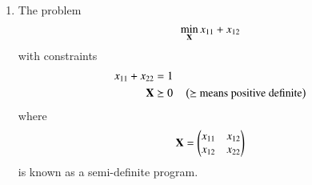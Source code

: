 \begin{enumerate}[label=\thesection.\arabic*,ref=\thesection.\theenumi]
%
%
%


\item
%
\label{prob:cvxopt}

The problem
\begin{equation}
\min_{\mathbf{X}} x_{11} + x_{12}
\end{equation}
%	
with constraints
\begin{align}
x_{11} + x_{22} &= 1 \\	
\mathbf{X}
& \succeq 0 \quad  \left(\text{$\succeq$ means positive definite}\right)
\end{align}
%
where
\begin{equation}
\mathbf{X}=
\begin{pmatrix}
x_{11} & x_{12} \\
x_{12} & x_{22}
\end{pmatrix} 
\end{equation}
%
is known as a semi-definite program. 


\end{enumerate}
